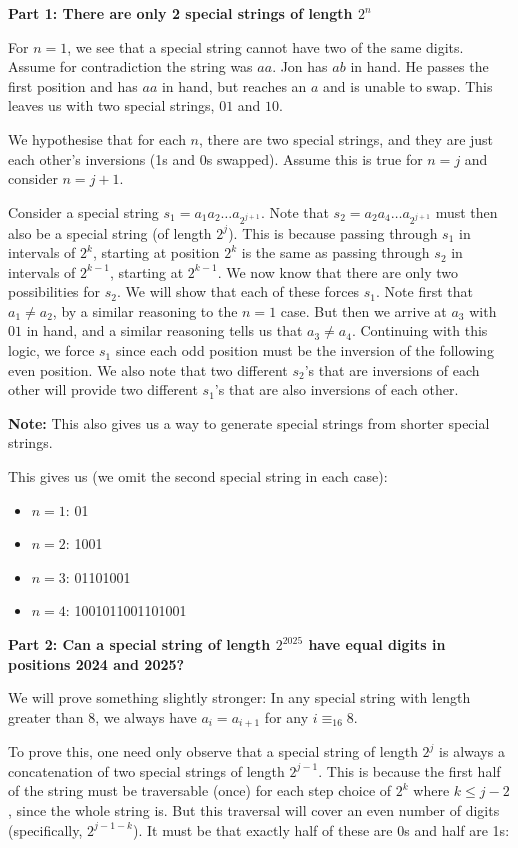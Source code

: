 \documentclass[11pt]{article}
\begin{document}
\textbf{Part 1: There are only 2 special strings of length $2^n$}

For $n = 1$, we see that a special string cannot have two of the same digits. Assume for contradiction the string was $aa$. Jon has $ab$ in hand. He passes the first position and has $aa$ in hand, but reaches an $a$ and is unable to swap. This leaves us with two special strings, $01$ and $10$.

We hypothesise that for each $n$, there are two special strings, and they are just each other's inversions (1s and 0s swapped). Assume this is true for $n=j$ and consider $n=j+1$.

Consider a special string $s_1 = a_1a_2\ldots a_{2^{j+1}}$. Note that $s_2 = a_2a_4\ldots a_{2^{j+1}}$ must then also be a special string (of length $2^j$). This is because passing through $s_1$ in intervals of $2^k$, starting at position $2^k$ is the same as passing through $s_2$ in intervals of $2^{k-1}$, starting at $2^{k-1}$. We now know that there are only two possibilities for $s_2$. We will show that each of these forces $s_1$. Note first that $a_1 \neq a_2$, by a similar reasoning to the $n = 1$ case. But then we arrive at $a_3$ with $01$ in hand, and a similar reasoning tells us that $a_3 \neq a_4$. Continuing with this logic, we force $s_1$ since each odd position must be the inversion of the following even position. We also note that two different $s_2$'s that are inversions of each other will provide two different $s_1$'s that are also inversions of each other.

\textbf{Note:} This also gives us a way to generate special strings from shorter special strings.

This gives us (we omit the second special string in each case):
\begin{itemize}
    \item $n=1$: 01
    \item $n=2$: 1001
    \item $n=3$: 01101001
    \item $n=4$: 1001011001101001
\end{itemize}

\textbf{Part 2: Can a special string of length $2^{2025}$ have equal digits in positions 2024 and 2025?}

We will prove something slightly stronger: In any special string with length greater than 8, we always have $a_i = a_{i+1}$ for any $i \equiv_{16} 8$.

To prove this, one need only observe that a special string of length $2^j$ is always a concatenation of two special strings of length $2^{j-1}$. This is because the first half of the string must be traversable (once) for each step choice of $2^k$ where $k \leq j-2$, since the whole string is. But this traversal will cover an even number of digits (specifically, $2^{j-1-k}$). It must be that exactly half of these are 0s and half are 1s:
\end{document}
